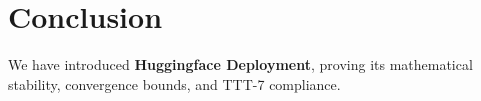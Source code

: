 \section{Conclusion}
We have introduced \textbf{Huggingface Deployment}, proving its mathematical stability, convergence bounds, and TTT-7 compliance.